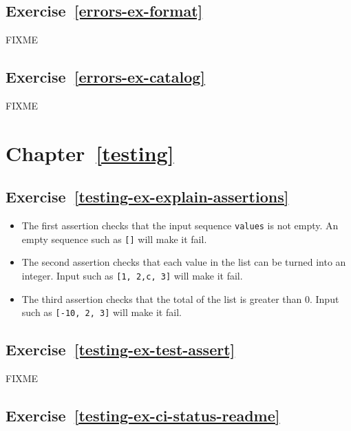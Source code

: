 \documentclass[
]{krantz}
\begin{document}
\hypertarget{exercise-referrors-ex-format}{%
\subsection*{Exercise~\ref{errors-ex-format}}\label{exercise-referrors-ex-format}}


FIXME

\hypertarget{exercise-referrors-ex-catalog}{%
\subsection*{Exercise~\ref{errors-ex-catalog}}\label{exercise-referrors-ex-catalog}}


FIXME

\hypertarget{chapter-reftesting}{%
\section*{Chapter~\ref{testing}}\label{chapter-reftesting}}

\hypertarget{exercise-reftesting-ex-explain-assertions}{%
\subsection*{Exercise~\ref{testing-ex-explain-assertions}}\label{exercise-reftesting-ex-explain-assertions}}


\begin{itemize}
\item
  The first assertion checks that the input sequence \texttt{values} is not empty.
  An empty sequence such as \texttt{{[}{]}} will make it fail.
\item
  The second assertion checks that each value in the list can be turned into an integer.
  Input such as \texttt{{[}1,\ 2,\textquotesingle{}c\textquotesingle{},\ 3{]}} will make it fail.
\item
  The third assertion checks that the total of the list is greater than 0.
  Input such as \texttt{{[}-10,\ 2,\ 3{]}} will make it fail.
\end{itemize}

\hypertarget{exercise-reftesting-ex-test-assert}{%
\subsection*{Exercise~\ref{testing-ex-test-assert}}\label{exercise-reftesting-ex-test-assert}}


FIXME

\hypertarget{exercise-reftesting-ex-ci-status-readme}{%
\subsection*{Exercise~\ref{testing-ex-ci-status-readme}}\label{exercise-reftesting-ex-ci-status-readme}}
\end{document}
